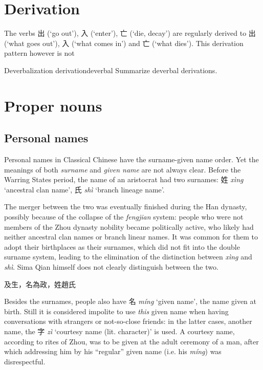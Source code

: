 \documentclass[UTF8, a4paper, oneside, scheme=plain, 12pt]{ctexrep}
\newcommand*{\term}[1]{\emph{#1}}
\newcommand{\form}[1]{\emph{#1}}
\newcommand{\translate}[1]{`#1'}
\begin{document}
\section{Derivation}

The verbs 出 (\translate{go out}), 入 (\translate{enter}), 亡 (\translate{die, decay})
are regularly derived to 出 (\translate{what goes out}), 入 (\translate{what comes in})
and 亡 (\translate{what dies}).
This derivation pattern however is not 

\begin{todobox}{Deverbalization derivation}{deverbal}
    Summarize deverbal derivations.  
\end{todobox}

\section{Proper nouns}

\subsection{Personal names}

Personal names in Classical Chinese have the surname-given name order.
Yet the meanings of both \term{surname} and \term{given name} are not always clear.
Before the Warring States period, the name of an aristocrat had two surnames:
姓 \form{xìng} \translate{ancestral clan name}, 氏 \form{shì} \translate{branch lineage name}.

The merger between the two was eventually finished during the Han dynasty,
possibly because of the collapse of the \form{fengjian} system:
people who were not members of the Zhou dynasty nobility became politically active,
who likely had neither ancestral clan names or branch linear names.
It was common for them to adopt their birthplaces as their surnames,
which did not fit into the double surname system,
leading to the elimination of the distinction between \form{xìng} and \form{shì}.
Sima Qian himself does not clearly distinguish between the two.

\begin{exe}
    \ex 及生，名為政，姓趙氏
\end{exe}

Besides the surnames, people also have 名 \form{míng} \translate{given name},
the name given at birth.
Still it is considered impolite to use \emph{this} given name when having conversations with strangers or not-so-close friends:
in the latter cases, another name, the 字 \form{zì} \translate{courtesy name (lit. character)} is used.
A courtesy name, according to rites of Zhou,
was to be given at the adult ceremony of a man,
after which addressing him by his ``regular'' given name (i.e. his \form{míng}) was disrespectful.
\end{document}
